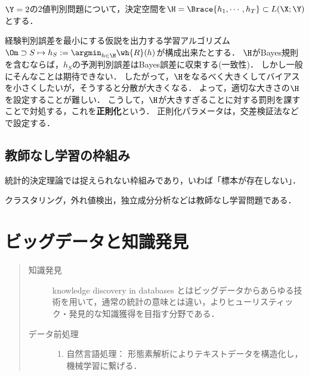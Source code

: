 \documentclass[uplatex,dvipdfmx]{jsreport}
\begin{document}
\begin{problem}
    $\Y=2$の2値判別問題について，決定空間を$\H=\Brace{h_1,\cdots,h_T}\subset L(\X;\Y)$とする．
\end{problem}
\begin{observation}
    経験判別誤差を最小にする仮説を出力する学習アルゴリズム$\Om\supset S\mapsto h_S:=\argmin_{h\in\H}\wh{R}(h)$が構成出来たとする．
    $\H$がBayes規則を含むならば，$h_S$の予測判別誤差はBayes誤差に収束する(一致性)．
    しかし一般にそんなことは期待できない．
    したがって，$\H$をなるべく大きくしてバイアスを小さくしたいが，そうすると分散が大きくなる．
    よって，適切な大きさの$\H$を設定することが難しい．
    こうして，$\H$が大きすぎることに対する罰則を課すことで対処する，これを\textbf{正則化}という．
    正則化パラメータは，交差検証法などで設定する．
\end{observation}

\section{教師なし学習の枠組み}

\begin{tcolorbox}[colframe=ForestGreen, colback=ForestGreen!10!white,breakable,colbacktitle=ForestGreen!40!white,coltitle=black,fonttitle=\bfseries\sffamily,
title=]
    統計的決定理論では捉えられない枠組みであり，いわば「標本が存在しない」．
\end{tcolorbox}

\begin{example}
    クラスタリング，外れ値検出，独立成分分析などは教師なし学習問題である．
\end{example}

\chapter{ビッグデータと知識発見}

\begin{quotation}
    \begin{description}
        \item[知識発見] knowledge discovery in databases とはビッグデータからあらゆる技術を用いて，通常の統計の意味とは違い，よりヒューリスティック・発見的な知識獲得を目指す分野である．
        \item[データ前処理] \begin{enumerate}
            \item 自然言語処理： 形態素解析によりテキストデータを構造化し，機械学習に繋げる．
        \end{enumerate}
    \end{description}
\end{quotation}
\end{document}
